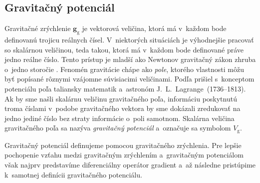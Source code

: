 \documentclass[a4paper,12pt]{book}
\newcommand{\gidx}{\mathrm g}
\let\vec\mathbf
\begin{document}
\subsection{Gravitačný potenciál}
\label{sec:vg}

Gravitačné zrýchlenie $\vec g_\gidx$ je vektorová veličina, ktorá má v~každom 
bode definovanú trojicu reálnych čísel.  V~niektorých situáciách je výhodnejšie 
pracovať so skalárnou veličinou, teda takou, ktorá má v~každom bode definované 
práve jedno reálne číslo.  Tento prístup je mladší ako Newtonov gravitačný 
zákon zhruba o~jedno storočie \parencite{MacMillan1930,Jekeli2015}.  Fenomén 
gravitácie chápe ako \emph{pole}, ktorého vlastnosti môžu byť popísané rôznymi 
vzájomne súvisiacimi veličinami.  Podľa \textcite{MacMillan1930} prišiel 
s~konceptom potenciálu poľa taliansky matematik a~astronóm 
J.~L.~Lagrange~(1736--1813).  Ak by sme našli skalárnu veličinu gravitačného 
poľa, informáciu poskytnutú troma číslami v~podobe gravitačného vektora by sme 
dokázali zredukovať na jedno jediné číslo bez straty informácie o~poli 
samotnom.  Skalárna veličina gravitačného poľa sa nazýva \emph{gravitačný 
potenciál} a~označuje sa symbolom $V_\gidx$.

Gravitačný potenciál definujeme pomocou gravitačného zrýchlenia.  Pre lepšie
pochopenie vzťahu medzi gravitačným zrýchlením a~gravitačným potenciálom však
najprv predstavíme diferenciálny operátor gradient a~až následne pristúpime
k~samotnej definícii gravitačného potenciálu.
\end{document}
